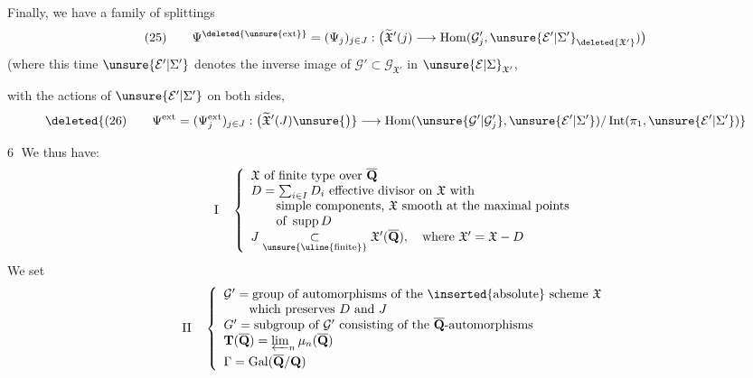 Finally, we have a family of  splittings
\[
(25)\qquad\Psi^{\deleted{\unsure{\mathrm{ext}}}}=(\Psi_j)_{j\in J}:\bigl(\widetilde{\mathfrak X}'(j)\longrightarrow\operatorname{Hom}(\mathcal G'_j,\unsure{\mathcal E'|\Sigma'}_{\deleted{\mathfrak X'}})\bigr)
\]
(where this time $\unsure{\mathcal E'|\Sigma'}$ denotes the inverse image
of $\mathcal G'\subset\mathcal G_{\mathfrak X'}$ in $\unsure{\mathcal E|\Sigma}_{\mathfrak X'}$, 
with the actions of $\unsure{\mathcal E'|\Sigma'}$ on both
sides, 
\[
\deleted{(26)\qquad\Psi^{\mathrm{ext}}=(\Psi_j^{\mathrm{ext}})_{j\in J}:\bigl(\widetilde{\mathfrak X}'(J)\unsure{\bigr)}\longrightarrow\operatorname{Hom}(\unsure{\mathcal G'|\mathcal G'_j},\unsure{\mathcal E'|\Sigma'})/\operatorname{Int}(\pi_1,\unsure{\mathcal E'|\Sigma'})}
\]

\textcircled{6}  We thus have: 
\[
\mathrm I\quad\left\{\begin{array}{l}
\mathfrak X\text{ of finite type over }\overline{\mathbf Q}\\
D=\sum_{i\in I}D_i\text{ effective divisor on }\mathfrak X\text{ with}\\
\qquad\text{simple components, }\mathfrak X\text{ smooth at the maximal points}\\
\qquad\text{of }\operatorname{supp}D\\
J\underset{\text{\unsure{\uline{finite}}}}{\subset}\mathfrak X'(\overline{\mathbf Q}),\quad\text{where }\mathfrak X'=\mathfrak X-D
\end{array}\right.
\]
We set\margin{(}
\[
\mathrm{II}\quad\left\{\begin{array}{l}
\mathcal G'=\text{group of automorphisms of the \inserted{absolute} scheme }\mathfrak X\\
\qquad\text{which preserves }D\text{ and }J\\
G'=\text{subgroup of }\mathcal G'\text{ consisting of the }\overline{\mathbf Q}\text{-automorphisms}\\
\mathbf T(\overline{\mathbf Q})=\varprojlim_n\mu_n(\overline{\mathbf Q})\\[1ex]
\Gamma=\operatorname{Gal}(\overline{\mathbf Q}/\mathbf Q)
\end{array}\right.
\]
